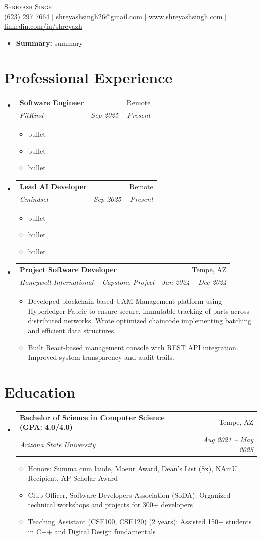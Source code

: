 \documentclass[letterpaper,10pt]{article}
\makeatletter
\newcommand{\resumeItem}[1]{
  \item\small{{#1 \vspace{-2pt}}}
}
\newcommand{\resumeSubheading}[4]{
  \vspace{-2pt}\item
    \begin{tabular*}{0.97\textwidth}[t]{l@{\extracolsep{\fill}}r}
      \textbf{#1} & #2 \\
      \textit{\small#3} & \textit{\small #4} \\
    \end{tabular*}\vspace{-7pt}
}
\newcommand{\resumeSubHeadingListStart}{\begin{itemize}[leftmargin=0.15in, label={}]}
\newcommand{\resumeSubHeadingListEnd}{\end{itemize}}
\newcommand{\resumeItemListStart}{\begin{itemize}}
\newcommand{\resumeItemListEnd}{\end{itemize}\vspace{-5pt}}
\makeatother
\begin{document}
\begin{center}
    {\Huge \scshape Shreyash Singh} \\ \vspace{2pt}
    \small (623) 297 7664 $\vert$ \href{mailto:shreyashsingh26@gmail.com}{shreyashsingh26@gmail.com} $\vert$ \href{http://www.shreyashsingh.com}{www.shreyashsingh.com} $\vert$ \href{https://linkedin.com/in/shreyazh}{linkedin.com/in/shreyazh}
\end{center}

\vspace{-4pt}

  \begin{itemize}[leftmargin=0.15in, label={}]
    \item \small{\textbf{Summary:} {{ summary }}}
\end{itemize}

\section{Professional Experience}
  \resumeSubHeadingListStart

    \resumeSubheading
      {Software Engineer}{Remote}
      {FitKind}{Sep 2025 -- Present}
      \resumeItemListStart
            \resumeItem{ {{ bullet }} }
            \resumeItem{ {{ bullet }} }
            \resumeItem{ {{ bullet }} }
    \resumeItemListEnd

    \resumeSubheading
      {Lead AI Developer}{Remote}
      {Cmindset}{Sep 2025 -- Present}
      \resumeItemListStart
            \resumeItem{ {{ bullet }} }
            \resumeItem{ {{ bullet }} }
            \resumeItem{ {{ bullet }} }
        \resumeItemListEnd
   
    \resumeSubheading
      {Project Software Developer}{Tempe, AZ}
      {Honeywell International -- Capstone Project}{Jan 2024 -- Dec 2024}
      \resumeItemListStart
        \resumeItem{Developed blockchain-based UAM Management platform using Hyperledger Fabric to ensure secure, immutable tracking of parts across distributed networks. Wrote optimized chaincode implementing batching and efficient data structures.}
        \resumeItem{Built React-based management console with REST API integration. Improved system transparency and audit trails.}
      \resumeItemListEnd
  \resumeSubHeadingListEnd

\section{Education}
  \resumeSubHeadingListStart
    \resumeSubheading
      {Bachelor of Science in Computer Science (GPA: 4.0/4.0)}{Tempe, AZ}
      {Arizona State University}{Aug 2021 -- May 2025}
      \resumeItemListStart
        \resumeItem{Honors: Summa cum laude, Moeur Award, Dean's List (8x), NAmU Recipient, AP Scholar Award}
        \resumeItem{Club Officer, Software Developers Association (SoDA): Organized technical workshops and projects for 300+ developers}
        \resumeItem{Teaching Assistant (CSE100, CSE120) (2 years): Assisted 150+ students in C++ and Digital Design fundamentals}
      \resumeItemListEnd
  \resumeSubHeadingListEnd
\end{document}

